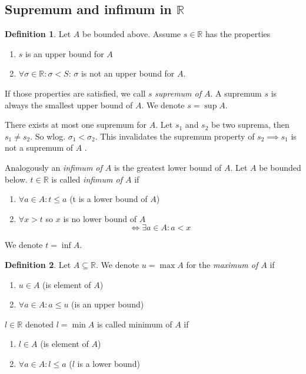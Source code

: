 \documentclass[a4paper,landscape,twocolumn]{article}
\theoremstyle{definition}
\newtheorem{defi}{Definition}
\begin{document}
\subsection{Supremum and infimum in $\mathbb R$}
\begin{defi}
  Let $A$ be bounded above.
  Assume $s \in \mathbb R$ has the properties
  \begin{enumerate}
    \item $s$ is an upper bound for $A$
    \item $\forall \sigma \in \mathbb R: \sigma < S$: $\sigma$ is not an upper bound for $A$.
  \end{enumerate}
  If those properties are satisfied, we call $s$ \emph{supremum of $A$}.
  A supremum $s$ is always the smallest upper bound of $A$.
  We denote $s = \sup{A}$.

  There exists at most one supremum for $A$. Let $s_1$ and $s_2$ be two suprema,
  then $s_1 \neq s_2$. So wlog. $\sigma_1 < \sigma_2$. This invalidates the supremum
  property of $s_2 \implies s_1$ is not a supremum of $A$ \lightning.

  Analogously an \emph{infimum of $A$} is the greatest lower bound of $A$.
  Let $A$ be bounded below. $t \in \mathbb R$ is called \emph{infimum of $A$}
  if
  \begin{enumerate}
    \item $\forall a \in A: t \leq a$ (t is a lower bound of $A$)
    \item $\forall x > t$ so $x$ is no lower bound of $A$
      \[ \iff \exists a \in A: a < x \]
  \end{enumerate}
  We denote $t = \inf{A}$.
\end{defi}

\begin{defi}
  Let $A \subseteq \mathbb R$. We denote $u = \max{A}$ for the \emph{maximum of $A$} if
  \begin{enumerate}
    \item $u \in A$ (is element of $A$)
    \item $\forall a \in A: a \leq u$ (is an upper bound)
  \end{enumerate}
  $l \in \mathbb R$ denoted $l = \min{A}$ is called minimum of $A$ if
  \begin{enumerate}
    \item $l \in A$ (is element of $A$)
    \item $\forall a \in A: l \leq a$ ($l$ is a lower bound)
  \end{enumerate}
\end{defi}
\end{document}

